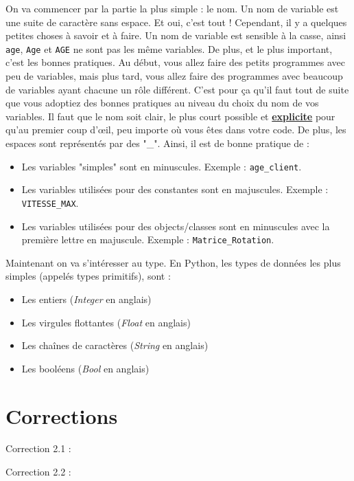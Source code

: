 \documentclass[a4paper,12pt]{article}
\begin{document}
On va commencer par la partie la plus simple : le nom. Un nom de variable est une suite de caractère sans espace. Et oui, c'est tout !
Cependant, il y a quelques petites choses à savoir et à faire. Un nom de variable est sensible à la casse, ainsi \lstinline[style=pythoninline]{age}, 
\lstinline[style=pythoninline]{Age} et \lstinline[style=pythoninline]{AGE} ne sont pas les même variables.\newline
De plus, et le plus important, c'est les bonnes pratiques. Au début, vous allez faire des petits programmes avec peu de variables, mais plus tard, 
vous allez faire des programmes avec beaucoup de variables ayant chacune un rôle différent. C'est pour ça qu'il faut tout de suite que vous adoptiez des bonnes pratiques au niveau du choix du nom de vos variables. 
Il faut que le nom soit clair, le plus court possible et \textbf{\underline{explicite}} pour qu'au premier coup d'œil, peu importe où vous êtes dans votre code. 
De plus, les espaces sont représentés par des "\_".
Ainsi, il est de bonne pratique de : 
\begin{itemize}
    \item Les variables "simples" sont en minuscules. Exemple : \lstinline[style=pythoninline]{age_client}.
    \item Les variables utilisées pour des constantes sont en majuscules. Exemple : \lstinline[style=pythoninline]{VITESSE_MAX}.
    \item Les variables utilisées pour des objects/classes sont en minuscules avec la première lettre en majuscule. Exemple : \lstinline[style=pythoninline]{Matrice_Rotation}.
\end{itemize}

Maintenant on va s'intéresser au type. En Python, les types de données les plus simples (appelés types primitifs), sont : 
\begin{itemize}
    \item Les entiers (\textit{Integer} en anglais)
    \item Les virgules flottantes (\textit{Float} en anglais)
    \item Les chaînes de caractères (\textit{String} en anglais)
    \item Les booléens (\textit{Bool} en anglais)
\end{itemize}

\newpage

\section{Corrections}

\hypertarget{AncreExo2.1}{Correction 2.1 : }
\hypertarget{AncreExo2.2}{Correction 2.2 : }
\end{document}
